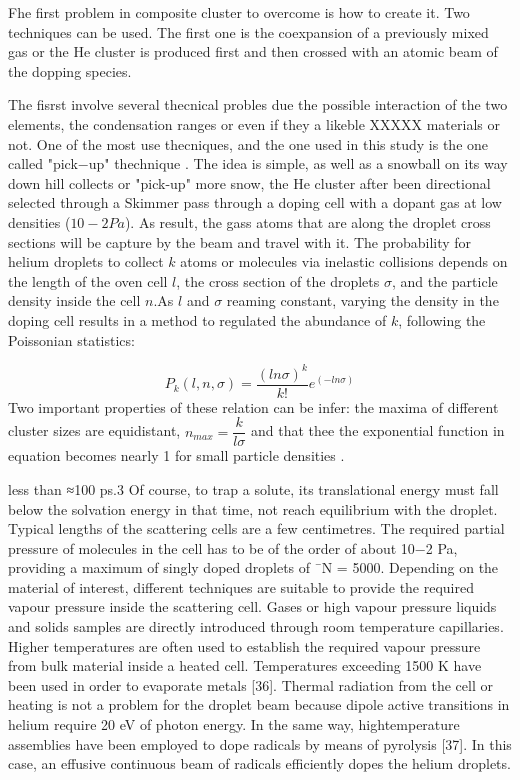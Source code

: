 Fhe first problem in composite cluster to overcome is how to create it. Two techniques can be used. The first one is the coexpansion of
a previously mixed gas \cite{tchaplyguine_variable_2004} or the He cluster is produced first and then crossed with an atomic beam of the dopping species.

The fisrst involve several thecnical probles due the  possible interaction of the two elements, the condensation ranges or even if they a likeble XXXXX materials or not. One of the most use thecniques, and the one used in this study is the one called "pick$-$up" thechnique \cite{gough_infrared_1985}. The idea is simple, as well as a snowball on its way down hill collects or "pick-up" more snow, the He cluster after been directional selected through a Skimmer  pass through a doping cell with a dopant gas at low densities ($10−2 Pa$)\cite{stienkemeier_spectroscopy_2006}. As result, the gass atoms that are along the droplet cross sections will be capture by the beam and travel with it. The probability for helium droplets to collect $k$ atoms or molecules via inelastic collisions depends on the length of the oven cell $l$, the cross section of the droplets $\sigma$, and the particle density inside the cell $n$.As $l$ and $\sigma$ reaming constant, varying the density in the doping cell results in a method to regulated the abundance of $k$, following the Poissonian statistics:

\begin{equation}
P_{k}(l,n,\sigma)=\dfrac{(ln\sigma)^{k}}{k!} e^{(-ln\sigma)}
\end{equation}
Two important properties of these relation can be infer: the maxima of
different cluster sizes  are equidistant, $n_{max}=\dfrac{k}{l\sigma}$ and that thee the exponential function in equation  becomes  nearly  1  for  small  particle  densities \cite{bunermann_modeling_2011}.



less than ≈100 ps.3 Of course, to trap a solute, its translational energy must fall below the
solvation energy in that time, not reach equilibrium with the droplet. Typical lengths of the
scattering cells are a few centimetres. The required partial pressure of molecules in the cell
has to be of the order of about 10−2 Pa, providing a maximum of singly doped droplets of
¯N
= 5000. Depending on the material of interest, different techniques are suitable to provide
the required vapour pressure inside the scattering cell. Gases or high vapour pressure liquids
and solids samples are directly introduced through room temperature capillaries. Higher
temperatures are often used to establish the required vapour pressure from bulk material inside
a heated cell. Temperatures exceeding 1500 K have been used in order to evaporate metals
[36]. Thermal radiation from the cell or heating is not a problem for the droplet beam because
dipole active transitions in helium require 20 eV of photon energy. In the same way, hightemperature
assemblies have been employed to dope radicals by means of pyrolysis [37]. In
this case, an effusive continuous beam of radicals efficiently dopes the helium droplets. 